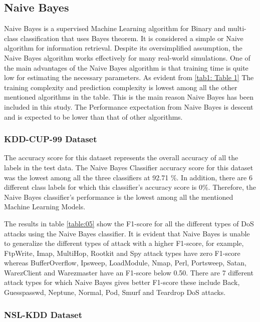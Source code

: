 \documentclass[conference]{IEEEtran}
\begin{document}
\subsection{Naive Bayes}
Naive Bayes \cite{NB} is a supervised Machine Learning algorithm for Binary and multi-class classification that uses Bayes theorem. It is considered a simple or Naive algorithm for information retrieval. Despite its oversimplified assumption, the Naive Bayes algorithm works effectively for many real-world simulations. One of the main advantages of the Naive Bayes algorithm is that training time is quite low for estimating the necessary parameters. As evident from \ref{tab1: Table 1} The training complexity and prediction complexity is lowest among all the other mentioned algorithms in the table. This is the main reason Naive Bayes has been included in this study. The Performance expectation from Naive Bayes is descent and is expected to be lower than that of other algorithms.  

\subsubsection{KDD-CUP-99 Dataset}

The accuracy score for this dataset represents the overall accuracy of all the labels in the test data. The Naive Bayes Classifier accuracy score for this dataset was the lowest among all the three classifiers at 92.71 \%. In addition, there are 6 different class labels for which this classifier's accuracy score is 0\%. Therefore, the Naive Bayes classifier's performance is the lowest among all the mentioned Machine Learning Models.

The results in table \ref{table:05} show the F1-score for all the different types of DoS attacks using the Naive Bayes classifier. It is evident that Naive Bayes \cite{NB} is unable to generalize the different types of attack with a higher F1-score, for example, FtpWrite, Imap, MultiHop, Rootkit and Spy attack types have zero F1-score whereas BufferOverflow, Ipsweep, LoadModule, Nmap, Perl, Portsweep, Satan, WarezClient and Warezmaster have an F1-score below 0.50. There are 7 different attack types for which Naive Bayes gives better F1-score these include Back, Guesspasswd, Neptune, Normal, Pod, Smurf and Teardrop DoS attacks. 


\subsubsection{NSL-KDD Dataset}
\end{document}
